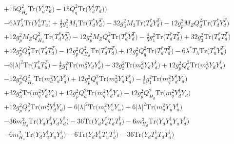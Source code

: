 \begin{align}
 &+15 Q_{H_d}^{2} \mbox{Tr}\Big({Y_{d}^{\dagger}  T_d}\Big) -15 Q_{q}^{2} \mbox{Tr}\Big({Y_{d}^{\dagger}  T_d}\Big) \Big)\nonumber \\ 
 &-6 \lambda T_{\lambda}^* \mbox{Tr}\Big({Y_{u}^{\dagger}  T_u}\Big) +\frac{4}{5} g_{1}^{2} M_1 \mbox{Tr}\Big({T_d^*  Y_{d}^{T}}\Big) -32 g_{3}^{2} M_3 \mbox{Tr}\Big({T_d^*  Y_{d}^{T}}\Big) -12 g_{p}^{2} M_Z Q_{d}^{2} \mbox{Tr}\Big({T_d^*  Y_{d}^{T}}\Big) \nonumber \\ 
 &+12 g_{p}^{2} M_Z Q_{H_d}^{2} \mbox{Tr}\Big({T_d^*  Y_{d}^{T}}\Big) -12 g_{p}^{2} M_Z Q_{q}^{2} \mbox{Tr}\Big({T_d^*  Y_{d}^{T}}\Big) -\frac{4}{5} g_{1}^{2} \mbox{Tr}\Big({T_d^*  T_{d}^{T}}\Big) +32 g_{3}^{2} \mbox{Tr}\Big({T_d^*  T_{d}^{T}}\Big) \nonumber \\ 
 &+12 g_{p}^{2} Q_{d}^{2} \mbox{Tr}\Big({T_d^*  T_{d}^{T}}\Big) -12 g_{p}^{2} Q_{H_d}^{2} \mbox{Tr}\Big({T_d^*  T_{d}^{T}}\Big) +12 g_{p}^{2} Q_{q}^{2} \mbox{Tr}\Big({T_d^*  T_{d}^{T}}\Big) -6 \lambda^* T_{\lambda} \mbox{Tr}\Big({T_u^*  Y_{u}^{T}}\Big) \nonumber \\ 
 &-6 |\lambda|^2 \mbox{Tr}\Big({T_u^*  T_{u}^{T}}\Big) -\frac{4}{5} g_{1}^{2} \mbox{Tr}\Big({m_d^2  Y_d  Y_{d}^{\dagger}}\Big) +32 g_{3}^{2} \mbox{Tr}\Big({m_d^2  Y_d  Y_{d}^{\dagger}}\Big) +12 g_{p}^{2} Q_{d}^{2} \mbox{Tr}\Big({m_d^2  Y_d  Y_{d}^{\dagger}}\Big) \nonumber \\ 
 &-12 g_{p}^{2} Q_{H_d}^{2} \mbox{Tr}\Big({m_d^2  Y_d  Y_{d}^{\dagger}}\Big) +12 g_{p}^{2} Q_{q}^{2} \mbox{Tr}\Big({m_d^2  Y_d  Y_{d}^{\dagger}}\Big) -\frac{4}{5} g_{1}^{2} \mbox{Tr}\Big({m_q^2  Y_{d}^{\dagger}  Y_d}\Big) \nonumber \\ 
 &+32 g_{3}^{2} \mbox{Tr}\Big({m_q^2  Y_{d}^{\dagger}  Y_d}\Big) +12 g_{p}^{2} Q_{d}^{2} \mbox{Tr}\Big({m_q^2  Y_{d}^{\dagger}  Y_d}\Big) -12 g_{p}^{2} Q_{H_d}^{2} \mbox{Tr}\Big({m_q^2  Y_{d}^{\dagger}  Y_d}\Big) \nonumber \\ 
 &+12 g_{p}^{2} Q_{q}^{2} \mbox{Tr}\Big({m_q^2  Y_{d}^{\dagger}  Y_d}\Big) -6 |\lambda|^2 \mbox{Tr}\Big({m_q^2  Y_{u}^{\dagger}  Y_u}\Big) -6 |\lambda|^2 \mbox{Tr}\Big({m_u^2  Y_u  Y_{u}^{\dagger}}\Big) \nonumber \\ 
 &-36 m_{H_d}^2 \mbox{Tr}\Big({Y_d  Y_{d}^{\dagger}  Y_d  Y_{d}^{\dagger}}\Big) -36 \mbox{Tr}\Big({Y_d  Y_{d}^{\dagger}  T_d  T_{d}^{\dagger}}\Big) -6 m_{H_d}^2 \mbox{Tr}\Big({Y_d  Y_{u}^{\dagger}  Y_u  Y_{d}^{\dagger}}\Big) \nonumber \\ 
 &-6 m_{H_u}^2 \mbox{Tr}\Big({Y_d  Y_{u}^{\dagger}  Y_u  Y_{d}^{\dagger}}\Big) -6 \mbox{Tr}\Big({Y_d  Y_{u}^{\dagger}  T_u  T_{d}^{\dagger}}\Big) -36 \mbox{Tr}\Big({Y_d  T_{d}^{\dagger}  T_d  Y_{d}^{\dagger}}\Big) \nonumber \\ 

\end{align}
